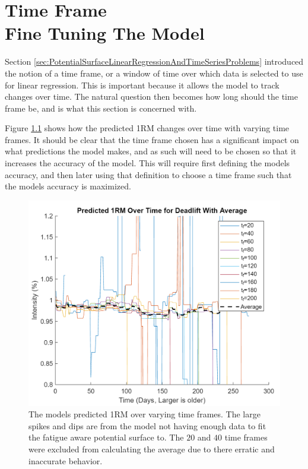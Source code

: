 \chapter{
    Time Frame
    \\
    \large{Fine Tuning The Model}
}
\label{sec:TimeFrame}

Section \ref{sec:PotentialSurfaceLinearRegressionAndTimeSeriesProblems} introduced the notion of a time frame, or a window of time over which data is selected to use for linear regression. This is important because it allows the model to track changes over time. The natural question then becomes how long should the time frame be, and is what this section is concerned with.

Figure \ref{fig:Pred1RMMultipleTimeFrames} shows how the predicted 1RM changes over time with varying time frames. It should be clear that the time frame chosen has a significant impact on what predictions the model makes, and as such will need to be chosen so that it increases the accuracy of the model. This will require first defining the models accuracy, and then later using that definition to choose a time frame such that the models accuracy is maximized.

\begin{figure}[h]
    \centering
    \includegraphics{DeadliftConstants/pred1RMMultipleTimeFrames.png}
    \caption{The models predicted 1RM over varying time frames. The large spikes and dips are from the model not having enough data to fit the fatigue aware potential surface to. The $20$ and $40$ time frames were excluded from calculating the average due to there erratic and inaccurate behavior.}
    \label{fig:Pred1RMMultipleTimeFrames}
\end{figure}

